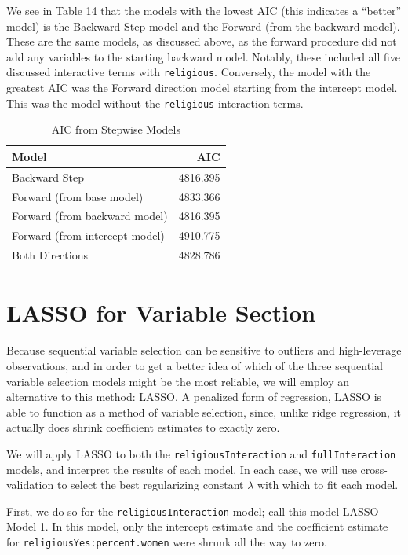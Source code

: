 \documentclass[
]{article}
\begin{document}
We see in Table 14 that the models with the lowest AIC (this indicates a
``better'' model) is the Backward Step model and the Forward (from the
backward model). These are the same models, as discussed above, as the
forward procedure did not add any variables to the starting backward
model. Notably, these included all five discussed interactive terms with
\texttt{religious}. Conversely, the model with the greatest AIC was the
Forward direction model starting from the intercept model. This was the
model without the \texttt{religious} interaction terms.

\begin{table}

\caption{\label{tab:unnamed-chunk-29}AIC from Stepwise Models}
\centering
\begin{tabular}[t]{l|r}
\hline
Model & AIC\\
\hline
Backward Step & 4816.395\\
\hline
Forward (from base model) & 4833.366\\
\hline
Forward (from backward model) & 4816.395\\
\hline
Forward (from intercept model) & 4910.775\\
\hline
Both Directions & 4828.786\\
\hline
\end{tabular}
\end{table}

\hypertarget{lasso-for-variable-section}{%
\section{LASSO for Variable Section}\label{lasso-for-variable-section}}

Because sequential variable selection can be sensitive to outliers and
high-leverage observations, and in order to get a better idea of which
of the three sequential variable selection models might be the most
reliable, we will employ an alternative to this method: LASSO. A
penalized form of regression, LASSO is able to function as a method of
variable selection, since, unlike ridge regression, it actually does
shrink coefficient estimates to exactly zero.

We will apply LASSO to both the \texttt{religiousInteraction} and
\texttt{fullInteraction} models, and interpret the results of each
model. In each case, we will use cross-validation to select the best
regularizing constant \(\lambda\) with which to fit each model.

First, we do so for the \texttt{religiousInteraction} model; call this
model LASSO Model 1. In this model, only the intercept estimate and the
coefficient estimate for \texttt{religiousYes:percent.women} were shrunk
all the way to zero.
\end{document}
